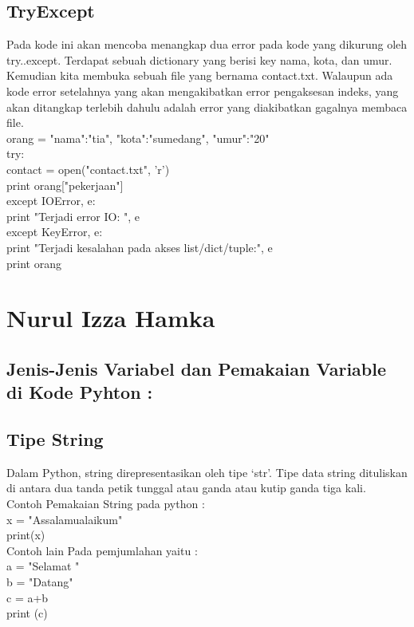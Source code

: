 \subsection{TryExcept}
Pada kode ini akan mencoba menangkap dua error pada kode yang dikurung oleh try..except. Terdapat sebuah dictionary yang berisi key nama, kota, dan umur. Kemudian kita membuka sebuah file yang bernama contact.txt. Walaupun ada kode error setelahnya yang akan mengakibatkan error pengaksesan indeks, yang akan ditangkap terlebih dahulu adalah error yang diakibatkan gagalnya membaca file.\\
orang = {"nama":"tia", "kota":"sumedang", "umur":"20"}\\

try:\\
    contact = open("contact.txt", 'r')\\
    print orang["pekerjaan"]\\
except IOError, e:\\
    print "Terjadi error IO: ", e\\
except KeyError, e:\\
    print "Terjadi kesalahan pada akses list/dict/tuple:", e\\

print orang


\section{Nurul Izza Hamka}
\subsection{Jenis-Jenis Variabel dan Pemakaian Variable di Kode Pyhton :} 
\subsection{Tipe String}
Dalam Python, string direpresentasikan oleh tipe ‘str’. Tipe data string dituliskan di antara dua tanda petik tunggal atau ganda atau kutip ganda tiga kali. \\

Contoh Pemakaian String pada python : \\
x = "Assalamualaikum"\\
print(x)
\\

	Contoh lain Pada pemjumlahan yaitu :
\\
a = "Selamat "\\
b = "Datang"\\
c = a+b\\
print (c)\\

